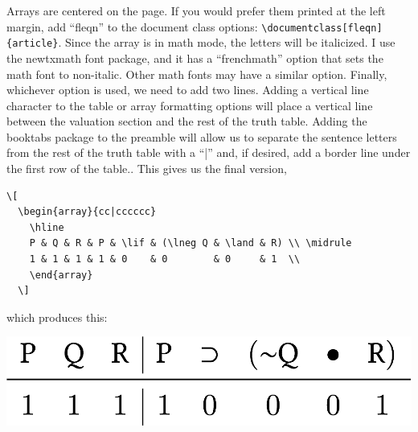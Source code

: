 \documentclass[11pt]{article}
\begin{document}
Arrays are centered on the page. If you would prefer them printed at the left margin, add ``fleqn'' to the document class options: \texttt{\textbackslash{}documentclass[fleqn]\{article\}}. Since the array is in math mode, the letters will be italicized. I use the newtxmath font package, and it has a ``frenchmath'' option that sets the math font to non-italic. Other math fonts may have a similar option. Finally, whichever option is used, we need to add two lines. Adding a vertical line character to the table or array formatting options will place a vertical line between the valuation section and the rest of the truth table. Adding the booktabs package to the preamble will allow us to separate the sentence letters from the rest of the truth table with a ``|'' and, if desired, add a border line under the first row of the table.. This gives us the final version, 

\begin{verbatim}
\[
  \begin{array}{cc|cccccc}
    \hline
    P & Q & R & P & \lif & (\lneg Q & \land & R) \\ \midrule
    1 & 1 & 1 & 1 & 0    & 0        & 0     & 1  \\ 
    \end{array}
  \]
\end{verbatim}

which produces this: 

\begin{center}
\begin{center}
\includegraphics[width=.9\linewidth]{../images/posts/20180210-truth-table.png}
\end{center}
\end{center}
\end{document}
